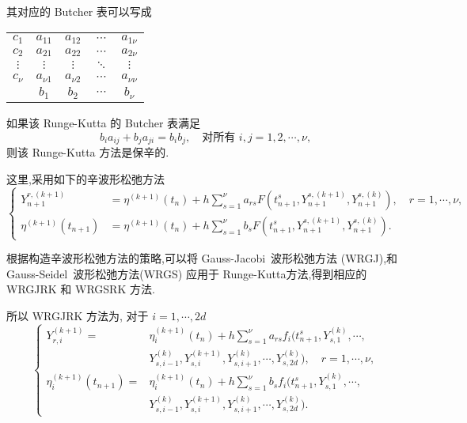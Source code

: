 其对应的 Butcher 表可以写成

\begin{center}
  \begin{tabular}{c|cccc}
    $c_1$&$a_{11}$&$a_{12}$&$\cdots$&$a_{1\nu}$\\
    $c_2$&$a_{21}$&$a_{22}$&$\cdots$&$a_{2\nu}$\\
    $\vdots$&$\vdots$&$\vdots$&$\ddots$&$\vdots$\\
    $c_{\nu}$&$a_{\nu 1}$&$a_{\nu 2}$&$\cdots$&$a_{\nu \nu}$\\
    \hline
         &$b_{1}$&$b_{2}$&$\cdots$&$b_{\nu}$
  \end{tabular}
\end{center}

如果该 Runge-Kutta 的 Butcher 表满足
\begin{equation*}
  b_ia_{ij}+b_ja_{ji}=b_ib_j,\quad \textrm{对所有}\,\, i,j=1,2,\cdots,\nu,
\end{equation*}
则该 Runge-Kutta 方法是保辛的.

这里,采用如下的辛波形松弛方法 \cite{bellen1993use}
\begin{equation*}
  \left\lbrace
    \begin{aligned}
      Y_{n+1}^{r,(k+1)}&=\eta^{(k+1)}(t_{n})+h\sum_{s=1}^{\nu}a_{rs}F(t_{n+1}^{s},Y_{n+1}^{s,(k+1)},Y_{n+1}^{s,(k)}),\quad r=1,\cdots, \nu, \\
      \eta^{(k+1)}(t_{n+1})&=\eta^{(k+1)}(t_{n})+h\sum_{s=1}^{\nu}b_{s}F(t_{n+1}^{s},Y_{n+1}^{s,(k+1)},Y_{n+1}^{s,(k)}).
    \end{aligned}
  \right.
\end{equation*}

根据构造辛波形松弛方法的策略,可以将 Gauss-Jacobi~波形松弛方法 (WRGJ),和 Gauss-Seidel~波形松弛方法(WRGS) 应用于 Runge-Kutta方法,得到相应的 WRGJRK 和 WRGSRK 方法.

所以 WRGJRK 方法为, 对于 $i=1,\cdots,2d$
\begin{equation*}
  \left\lbrace
    \begin{aligned}
      Y_{r,i}^{(k+1)}=&\eta_{i}^{(k+1)}(t_{n})+h\sum_{s=1}^{\nu}a_{rs}f_i(t_{n+1}^{s},Y_{s,1}^{(k)},\cdots,\\
      &Y_{s,i-1}^{(k)},Y_{s,i}^{(k+1)},Y_{s,i+1}^{(k)},\cdots,Y_{s,2d}^{(k)}),\quad r=1,\cdots, \nu, \\
      \eta_{i}^{(k+1)}(t_{n+1})=&\eta_{i}^{(k+1)}(t_{n})+h\sum_{s=1}^{\nu}b_{s}f_i(t_{n+1}^{s},Y_{s,1}^{(k)},\cdots,\\
      &Y_{s,i-1}^{(k)},Y_{s,i}^{(k+1)},Y_{s,i+1}^{(k)},\cdots,Y_{s,2d}^{(k)}).
    \end{aligned}
  \right.
\end{equation*}

